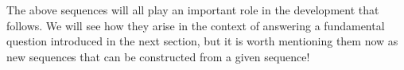 \documentclass{ximera}
\begin{document}
The above sequences will all play an important role in the development that follows.  We will see how they arise in the context of answering a fundamental question introduced in the next section, but it is worth mentioning them now as new sequences that can be constructed from a given sequence!


%
%
%
%
%
%
%
%
%
%
\end{document}
